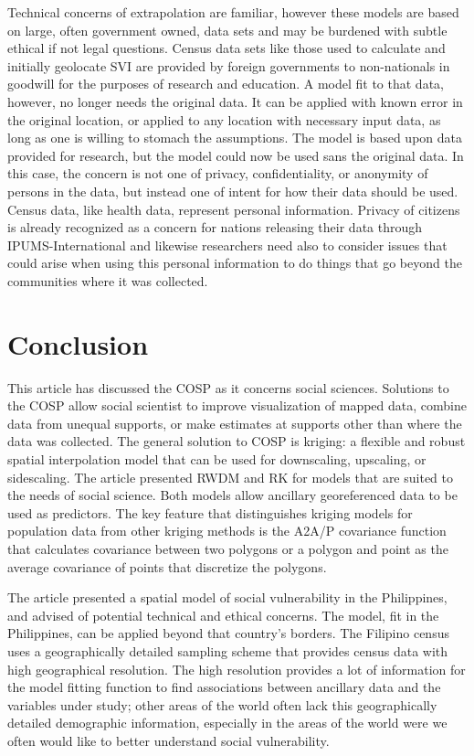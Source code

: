 \documentclass[]{interact}
\theoremstyle{plain}%
\theoremstyle{definition}
\theoremstyle{remark}
\begin{document}
Technical concerns of extrapolation are familiar, however these models are based on large, often government owned, data sets and may be burdened with subtle ethical if not legal questions.  Census data sets like those used to calculate and initially geolocate SVI are provided by foreign governments to non-nationals in goodwill for the purposes of research and education.  A model fit to that data, however, no longer needs the original data.  It can be applied with known error in the original location, or applied to any location with necessary input data, as long as one is willing to stomach the assumptions.  The model is based upon data provided for research, but the model could now be used sans the original data.  In this case, the concern is not one of privacy, confidentiality, or anonymity of persons in the data, but instead one of intent for how their data should be used.  Census data, like health data, represent personal information.  Privacy of citizens is already recognized as a concern for nations releasing their data through IPUMS-International \citep{mccaa06} and likewise researchers need also to consider issues that could arise when using this personal information to do things that go beyond the communities where it was collected.


\section{Conclusion}

This article has discussed the COSP as it concerns social sciences.  Solutions to the COSP allow social scientist to improve visualization of mapped data, combine data from unequal supports, or make estimates at supports other than where the data was collected.  The general solution to COSP is kriging: a flexible and robust spatial interpolation model that can be used for downscaling, upscaling, or sidescaling.  The article presented RWDM and RK for models that are suited to the needs of social science.  Both models allow ancillary georeferenced data to be used as predictors.  The key feature that distinguishes kriging models for population data from other kriging methods is the A2A/P covariance function that calculates covariance between two polygons or a polygon and point as the average covariance of points that discretize the polygons.

The article presented a spatial model of social vulnerability in the Philippines, and advised of potential technical and ethical concerns.  The model, fit in the Philippines, can be applied beyond that country's borders.  The Filipino census uses a geographically detailed sampling scheme that provides census data with high geographical resolution.  The high resolution provides a lot of information for the model fitting function to find associations between ancillary data and the variables under study; other areas of the world often lack this geographically detailed demographic information, especially in the areas of the world were we often would like to better understand social vulnerability.
\end{document}
